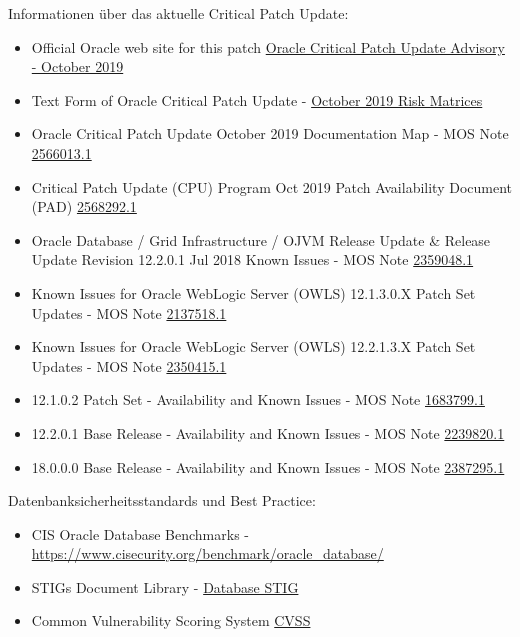 Informationen über das aktuelle Critical Patch Update:

\begin{itemize}
\tightlist
\item
  Official Oracle web site for this patch
  \href{https://www.oracle.com/technetwork/security-advisory/cpuoct2019-5072832.html}{Oracle
  Critical Patch Update Advisory - October 2019}
\item
  Text Form of Oracle Critical Patch Update -
  \href{https://www.oracle.com/technetwork/security-advisory/cpuoct2019verbose-5072833.html}{October
  2019 Risk Matrices}
\item
  Oracle Critical Patch Update October 2019 Documentation Map - MOS Note
  \href{https://support.oracle.com/epmos/faces/DocumentDisplay?id=2566013.1}{2566013.1}
\item
  Critical Patch Update (CPU) Program Oct 2019 Patch Availability
  Document (PAD)
  \href{https://support.oracle.com/epmos/faces/DocumentDisplay?id=2568292.1}{2568292.1}
\item
  Oracle Database / Grid Infrastructure / OJVM Release Update \& Release
  Update Revision 12.2.0.1 Jul 2018 Known Issues - MOS Note
  \href{https://support.oracle.com/epmos/faces/DocumentDisplay?id=2359048.1}{2359048.1}
\item
  Known Issues for Oracle WebLogic Server (OWLS) 12.1.3.0.X Patch Set
  Updates - MOS Note
  \href{https://support.oracle.com/epmos/faces/DocumentDisplay?id=2137518.1}{2137518.1}
\item
  Known Issues for Oracle WebLogic Server (OWLS) 12.2.1.3.X Patch Set
  Updates - MOS Note
  \href{https://support.oracle.com/epmos/faces/DocumentDisplay?id=2350415.1}{2350415.1}
\item
  12.1.0.2 Patch Set - Availability and Known Issues - MOS Note
  \href{https://support.oracle.com/epmos/faces/DocumentDisplay?id=1683799.1}{1683799.1}
\item
  12.2.0.1 Base Release - Availability and Known Issues - MOS Note
  \href{https://support.oracle.com/epmos/faces/DocumentDisplay?id=2239820.1}{2239820.1}
\item
  18.0.0.0 Base Release - Availability and Known Issues - MOS Note
  \href{https://support.oracle.com/epmos/faces/DocumentDisplay?id=2387295.1}{2387295.1}
\end{itemize}

Datenbanksicherheitsstandards und Best Practice:

\begin{itemize}
\tightlist
\item
  CIS Oracle Database Benchmarks -
  \url{https://www.cisecurity.org/benchmark/oracle_database/}
\item
  STIGs Document Library -
  \href{https://public.cyber.mil/stigs/downloads/?_dl_facet_stigs=app-security\%2Cdatabase}{Database
  STIG}
\item
  Common Vulnerability Scoring System
  \href{http://www.first.org/cvss/}{CVSS}
\end{itemize}

